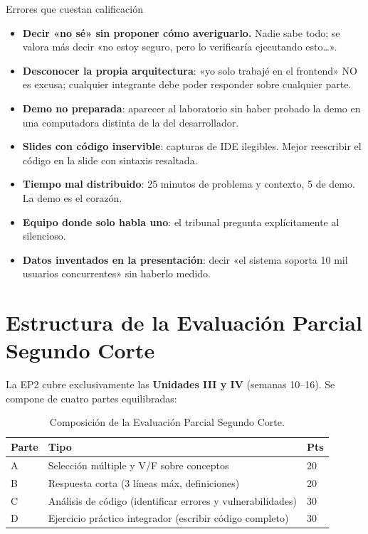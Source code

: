 \documentclass[11pt,a4paper,openany]{book}
\begin{document}
\begin{cajaadvertencia}{Errores que cuestan calificación}
\begin{itemize}
\item \textbf{Decir «no sé» sin proponer cómo averiguarlo.} Nadie
sabe todo; se valora más decir «no estoy seguro, pero lo verificaría
ejecutando esto\dots».
\item \textbf{Desconocer la propia arquitectura}: «yo solo trabajé en
el frontend» NO es excusa; cualquier integrante debe poder responder
sobre cualquier parte.
\item \textbf{Demo no preparada}: aparecer al laboratorio sin haber
probado la demo en una computadora distinta de la del desarrollador.
\item \textbf{Slides con código inservible}: capturas de IDE
ilegibles. Mejor reescribir el código en la slide con sintaxis
resaltada.
\item \textbf{Tiempo mal distribuido}: 25 minutos de problema y
contexto, 5 de demo. La demo es el corazón.
\item \textbf{Equipo donde solo habla uno}: el tribunal pregunta
explícitamente al silencioso.
\item \textbf{Datos inventados en la presentación}: decir «el sistema
soporta 10 mil usuarios concurrentes» sin haberlo medido.
\end{itemize}
\end{cajaadvertencia}

\section{Estructura de la Evaluación Parcial Segundo Corte}

La EP2 cubre exclusivamente las \textbf{Unidades III y IV} (semanas
10--16). Se compone de cuatro partes equilibradas:

\begin{table}[htbp]
\centering
\caption{Composición de la Evaluación Parcial Segundo Corte.}
\footnotesize
\begin{tabularx}{\textwidth}{lXl}
\toprule
\textbf{Parte} & \textbf{Tipo} & \textbf{Pts}\\
\midrule
A & Selección múltiple y V/F sobre conceptos & 20 \\
B & Respuesta corta (3 líneas máx, definiciones) & 20 \\
C & Análisis de código (identificar errores y vulnerabilidades) & 30 \\
D & Ejercicio práctico integrador (escribir código completo) & 30 \\
\bottomrule
\end{tabularx}
\end{table}
\end{document}
